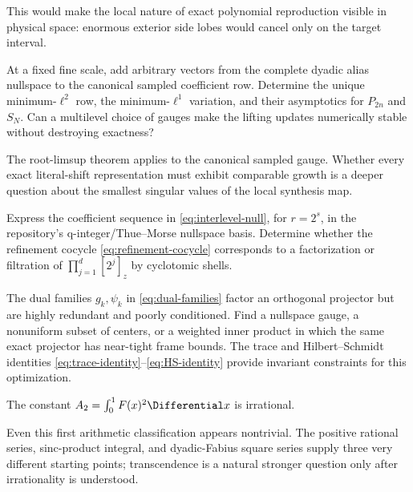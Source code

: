 \documentclass[11pt,oneside]{article}
\numberwithin{equation}{section}
\theoremstyle{definition}
\theoremstyle{remark}
\begin{document}
This would make the local nature of exact polynomial reproduction visible in
physical space: enormous exterior side lobes would cancel only on the target
interval.

\begin{problem}
\label{prob:gauge}
At a fixed fine scale, add arbitrary vectors from the complete dyadic alias
nullspace to the canonical sampled coefficient row.  Determine the unique
minimum-$\ell^2$ row, the minimum-$\ell^1$ variation, and their asymptotics for
$P_{2n}$ and $S_N$.  Can a multilevel choice of gauges make the lifting updates
numerically stable without destroying exactness?
\end{problem}

The root-limsup theorem applies to the canonical sampled gauge.  Whether every
exact literal-shift representation must exhibit comparable growth is a deeper
question about the smallest singular values of the local synthesis map.

\begin{problem}
\label{prob:cyclotomic-null}
Express the coefficient sequence in \eqref{eq:interlevel-null}, for
$r=2^s$, in the repository's q-integer/Thue--Morse nullspace basis.  Determine
whether the refinement cocycle \eqref{eq:refinement-cocycle} corresponds to a
factorization or filtration of
$\prod_{j=1}^{d}[2^j]_z$ by cyclotomic shells.
\end{problem}

\begin{problem}
\label{prob:tight-frame}
The dual families $g_k,\psi_k$ in \eqref{eq:dual-families} factor an
orthogonal projector but are highly redundant and poorly conditioned.  Find a
nullspace gauge, a nonuniform subset of centers, or a weighted inner product in
which the same exact projector has near-tight frame bounds.  The trace and
Hilbert--Schmidt identities \eqref{eq:trace-identity}--\eqref{eq:HS-identity}
provide invariant constraints for this optimization.
\end{problem}

\begin{conjecture}
\label{conj:A2-irrational}
The constant
\(
 A_2=\int_0^1F(x)^2\Differential x
\)
is irrational.
\end{conjecture}

Even this first arithmetic classification appears nontrivial.  The positive
rational series, sinc-product integral, and dyadic-Fabius square series supply
three very different starting points; transcendence is a natural stronger
question only after irrationality is understood.
\end{document}
